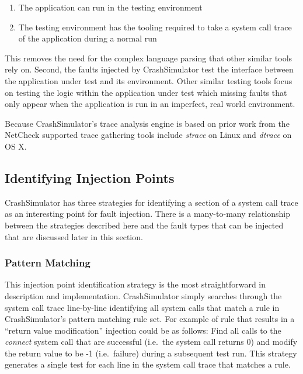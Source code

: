         \begin{enumerate}
            \item{The application can run in the testing environment}
            \item{The testing environment has the tooling required to take a system call trace of the application during
            a normal run}
        \end{enumerate}

        This removes the need for the complex language parsing that other similar tools rely on. Second, the faults
        injected by CrashSimulator test the interface between the application under test and its environment. Other
        similar testing tools focus on testing the logic within the application under test which missing faults that
        only appear when the application is run in an imperfect, real world environment.

        Because CrashSimulator's trace analysis engine is based on prior work from the NetCheck supported trace
        gathering tools include \emph{strace} on Linux and \emph{dtrace} on OS X.

    \subsection{Identifying Injection Points}

        CrashSimulator has three strategies for identifying a section of a system call trace as an interesting point for
        fault injection. There is a many-to-many relationship between the strategies described here and the fault types
        that can be injected that are discussed later in this section.

        \subsubsection{Pattern Matching}

            This injection point identification strategy is the most straightforward in description and implementation.
            CrashSimulator simply searches through the system call trace line-by-line identifying all system calls that
            match a rule in CrashSimulator's pattern matching rule set. For example of rule that results in a ``return
            value modification'' injection could be as follows: Find all calls to the \emph{connect} system call that
            are successful (i.e.\ the system call returns 0) and modify the return value to be -1 (i.e.\ failure) during
            a subsequent test run. This strategy generates a single test for each line in the system call trace that
            matches a rule.

